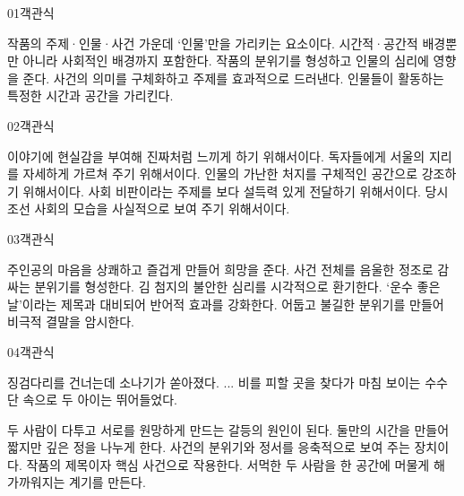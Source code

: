 \documentclass[fs85,seriesRus]{korfarm-base}
\begin{document}
\par\medskip
\kfBeginMC
\begin{kfQBlock}{01}{객관식}
\begin{kfChoices}
\kfChoice 작품의 주제·인물·사건 가운데 ‘인물’만을 가리키는 요소이다.
\kfChoice 시간적·공간적 배경뿐만 아니라 사회적인 배경까지 포함한다.
\kfChoice 작품의 분위기를 형성하고 인물의 심리에 영향을 준다.
\kfChoice 사건의 의미를 구체화하고 주제를 효과적으로 드러낸다.
\kfChoice 인물들이 활동하는 특정한 시간과 공간을 가리킨다.
\end{kfChoices}
\end{kfQBlock}
\begin{kfQBlock}{02}{객관식}
\begin{kfChoices}
\kfChoice 이야기에 현실감을 부여해 진짜처럼 느끼게 하기 위해서이다.
\kfChoice 독자들에게 서울의 지리를 자세하게 가르쳐 주기 위해서이다.
\kfChoice 인물의 가난한 처지를 구체적인 공간으로 강조하기 위해서이다.
\kfChoice 사회 비판이라는 주제를 보다 설득력 있게 전달하기 위해서이다.
\kfChoice 당시 조선 사회의 모습을 사실적으로 보여 주기 위해서이다.
\end{kfChoices}
\end{kfQBlock}
\begin{kfQBlock}{03}{객관식}
\begin{kfChoices}
\kfChoice 주인공의 마음을 상쾌하고 즐겁게 만들어 희망을 준다.
\kfChoice 사건 전체를 음울한 정조로 감싸는 분위기를 형성한다.
\kfChoice 김 첨지의 불안한 심리를 시각적으로 환기한다.
\kfChoice ‘운수 좋은 날’이라는 제목과 대비되어 반어적 효과를 강화한다.
\kfChoice 어둡고 불길한 분위기를 만들어 비극적 결말을 암시한다.
\end{kfChoices}
\end{kfQBlock}
\begin{kfQBlock}{04}{객관식}
\begin{kfEvidence}징검다리를 건너는데 소나기가 쏟아졌다. ... 비를 피할 곳을 찾다가 마침 보이는 수수단 속으로 두 아이는 뛰어들었다.\end{kfEvidence}
\begin{kfChoices}
\kfChoice 두 사람이 다투고 서로를 원망하게 만드는 갈등의 원인이 된다.
\kfChoice 둘만의 시간을 만들어 짧지만 깊은 정을 나누게 한다.
\kfChoice 사건의 분위기와 정서를 응축적으로 보여 주는 장치이다.
\kfChoice 작품의 제목이자 핵심 사건으로 작용한다.
\kfChoice 서먹한 두 사람을 한 공간에 머물게 해 가까워지는 계기를 만든다.
\end{kfChoices}
\end{kfQBlock}
\end{document}
